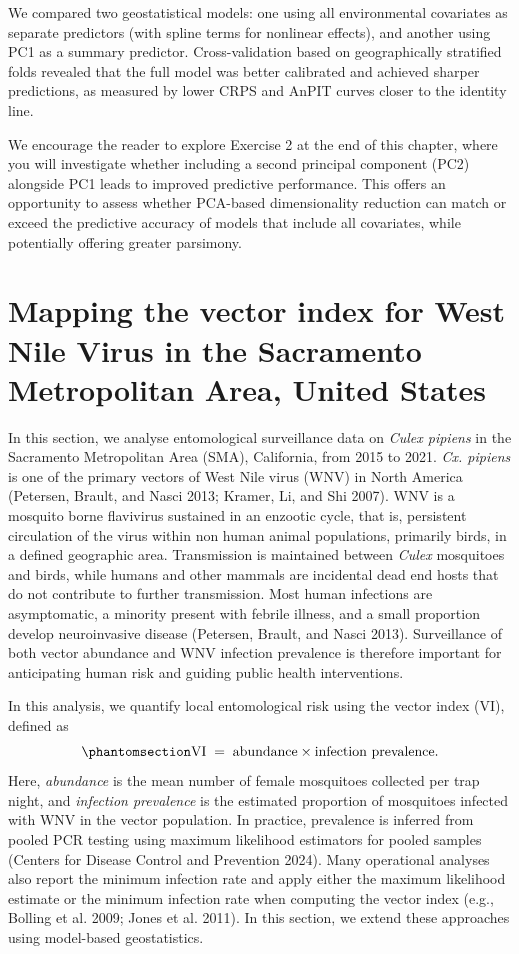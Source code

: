 \documentclass[
  letterpaper,
]{krantz}
\begin{document}
We compared two geostatistical models: one using all environmental
covariates as separate predictors (with spline terms for nonlinear
effects), and another using PC1 as a summary predictor. Cross-validation
based on geographically stratified folds revealed that the full model
was better calibrated and achieved sharper predictions, as measured by
lower CRPS and AnPIT curves closer to the identity line.

We encourage the reader to explore Exercise 2 at the end of this
chapter, where you will investigate whether including a second principal
component (PC2) alongside PC1 leads to improved predictive performance.
This offers an opportunity to assess whether PCA-based dimensionality
reduction can match or exceed the predictive accuracy of models that
include all covariates, while potentially offering greater parsimony.

\section{Mapping the vector index for West Nile Virus in the Sacramento
Metropolitan Area, United States}\label{sec-wnv}

In this section, we analyse entomological surveillance data on
\emph{Culex pipiens} in the Sacramento Metropolitan Area (SMA),
California, from 2015 to 2021. \emph{Cx. pipiens} is one of the primary
vectors of West Nile virus (WNV) in North America (Petersen, Brault, and
Nasci 2013; Kramer, Li, and Shi 2007). WNV is a mosquito borne
flavivirus sustained in an enzootic cycle, that is, persistent
circulation of the virus within non human animal populations, primarily
birds, in a defined geographic area. Transmission is maintained between
\emph{Culex} mosquitoes and birds, while humans and other mammals are
incidental dead end hosts that do not contribute to further
transmission. Most human infections are asymptomatic, a minority present
with febrile illness, and a small proportion develop neuroinvasive
disease (Petersen, Brault, and Nasci 2013). Surveillance of both vector
abundance and WNV infection prevalence is therefore important for
anticipating human risk and guiding public health interventions.

In this analysis, we quantify local entomological risk using the vector
index (VI), defined as \begin{equation}\phantomsection\label{eq-vi}{
\text{VI} \;=\; \text{abundance} \times \text{infection prevalence}.  
}\end{equation} Here, \emph{abundance} is the mean number of female
mosquitoes collected per trap night, and \emph{infection prevalence} is
the estimated proportion of mosquitoes infected with WNV in the vector
population. In practice, prevalence is inferred from pooled PCR testing
using maximum likelihood estimators for pooled samples (Centers for
Disease Control and Prevention 2024). Many operational analyses also
report the minimum infection rate and apply either the maximum
likelihood estimate or the minimum infection rate when computing the
vector index (e.g., Bolling et al. 2009; Jones et al. 2011). In this
section, we extend these approaches using model-based geostatistics.
\end{document}
